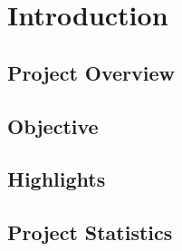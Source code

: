 \chapter{Introduction}
\section{Project Overview}

\section{Objective}

\section{Highlights}

\section{Project Statistics}
